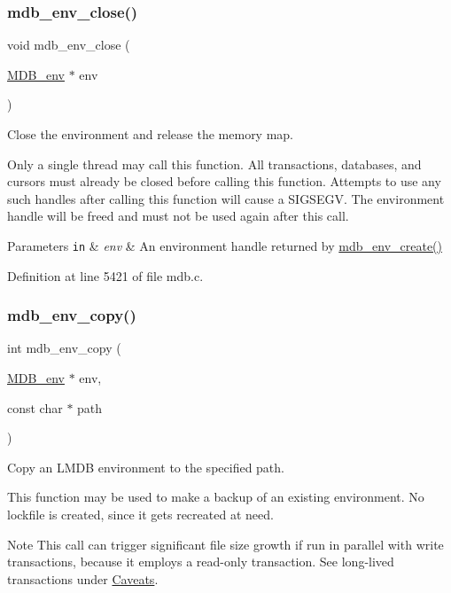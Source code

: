 \subsubsection{\texorpdfstring{mdb\+\_\+env\+\_\+close()}{mdb\_env\_close()}}
{\footnotesize\ttfamily void mdb\+\_\+env\+\_\+close (\begin{DoxyParamCaption}\item[{\mbox{\hyperlink{struct_m_d_b__env}{M\+D\+B\+\_\+env}} $\ast$}]{env }\end{DoxyParamCaption})}



Close the environment and release the memory map. 

Only a single thread may call this function. All transactions, databases, and cursors must already be closed before calling this function. Attempts to use any such handles after calling this function will cause a S\+I\+G\+S\+E\+GV. The environment handle will be freed and must not be used again after this call. 
\begin{DoxyParams}[1]{Parameters}
\mbox{\tt in}  & {\em env} & An environment handle returned by \mbox{\hyperlink{group__mdb_gaad6be3d8dcd4ea01f8df436f41d158d4}{mdb\+\_\+env\+\_\+create()}} \\
\hline
\end{DoxyParams}


Definition at line 5421 of file mdb.\+c.

\mbox{\label{group__mdb_ga5d51d6130325f7353db0955dbedbc378}} 
\subsubsection{\texorpdfstring{mdb\+\_\+env\+\_\+copy()}{mdb\_env\_copy()}}
{\footnotesize\ttfamily int mdb\+\_\+env\+\_\+copy (\begin{DoxyParamCaption}\item[{\mbox{\hyperlink{struct_m_d_b__env}{M\+D\+B\+\_\+env}} $\ast$}]{env,  }\item[{const char $\ast$}]{path }\end{DoxyParamCaption})}



Copy an L\+M\+DB environment to the specified path. 

This function may be used to make a backup of an existing environment. No lockfile is created, since it gets recreated at need. \begin{DoxyNote}{Note}
This call can trigger significant file size growth if run in parallel with write transactions, because it employs a read-\/only transaction. See long-\/lived transactions under \mbox{\hyperlink{lmdb.h_caveats_sec}{Caveats}}. 
\end{DoxyNote}

